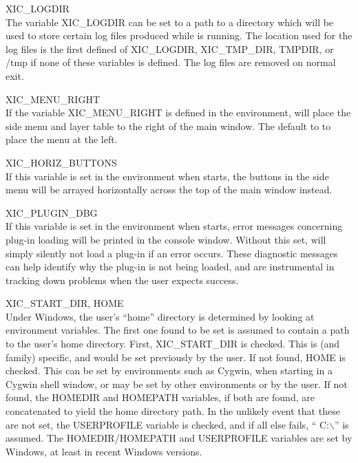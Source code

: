 \begin{description}
\item{\et XIC\_LOGDIR}\\
The variable {\et XIC\_LOGDIR} can be set to a path to a directory
which will be used to store certain log files produced while {\Xic} is
running.  The location used for the log files is the first defined of
{\et XIC\_LOGDIR}, {\et XIC\_TMP\_DIR}, {\et TMPDIR}, or {\vt /tmp} if
none of these variables is defined.  The log files are removed on
normal exit.

\item{\et XIC\_MENU\_RIGHT}\\
If the variable {\et XIC\_MENU\_RIGHT} is defined in the environment,
{\Xic} will place the side menu and layer table to the right of the
main window.  The default to to place the menu at the left.

\item{\et XIC\_HORIZ\_BUTTONS}\\
If this variable is set in the environment when {\Xic} starts, the
buttons in the side menu will be arrayed horizontally across the top
of the main window instead.

\item{\et XIC\_PLUGIN\_DBG}\\
If this variable is set in the environment when {\Xic} starts, error
messages concerning plug-in loading will be printed in the console
window.  Without this set, {\Xic} will simply silently not load a
plug-in if an error occurs.  These diagnostic messages can help
identify why the plug-in is not being loaded, and are instrumental in
tracking down problems when the user expects success.

\item{{\et XIC\_START\_DIR}, {\et HOME}}\\
Under Windows, the user's ``home'' directory is determined by looking
at environment variables.  The first one found to be set is assumed to
contain a path to the user's home directory.  First, {\et
XIC\_START\_DIR} is checked.  This is {\Xic} (and family) specific, and
would be set previously by the user.  If not found, {\et HOME} is
checked.  This can be set by environments such as Cygwin, when
starting in a Cygwin shell window, or may be set by other environments
or by the user.  If not found, the {\et HOMEDIR} and {\et HOMEPATH}
variables, if both are found, are concatenated to yield the home
directory path.  In the unlikely event that these are not set, the
{\et USERPROFILE} variable is checked, and if all else fails, ``{\vt
C:$\backslash$}'' is assumed.  The {\et HOMEDIR}/{\et HOMEPATH} and
{\et USERPROFILE} variables are set by Windows, at least in recent
Windows versions.


\end{description}

